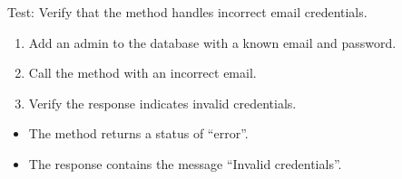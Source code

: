 \documentclass[letterpaper,10pt,english]{sphinxmanual}
\begin{document}
\begin{fulllineitems}
\label{\detokenize{test:test.test_admin.test_login_admin_invalid_email}}
\pysigstartsignatures
\pysiglinewithargsret
{}
{}
{}
\pysigstopsignatures
\sphinxAtStartPar
Test: Verify that the method handles incorrect email credentials.
\begin{description}
\begin{enumerate}
%
\item {} 
\sphinxAtStartPar
Add an admin to the database with a known email and password.

\item {} 
\sphinxAtStartPar
Call the  method with an incorrect email.

\item {} 
\sphinxAtStartPar
Verify the response indicates invalid credentials.

\end{enumerate}

\begin{itemize}
\item {} 
\sphinxAtStartPar
The method returns a status of “error”.

\item {} 
\sphinxAtStartPar
The response contains the message “Invalid credentials”.

\end{itemize}

\end{description}

\end{fulllineitems}

\end{document}
